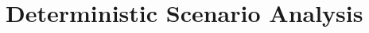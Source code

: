 \documentclass[12pt,a4paper,headings=small,version=first,dvips]{scrbook}
\begin{document}
\chapter{Deterministic Scenario Analysis}
	\label{chap:dsha}
	

\end{document}
